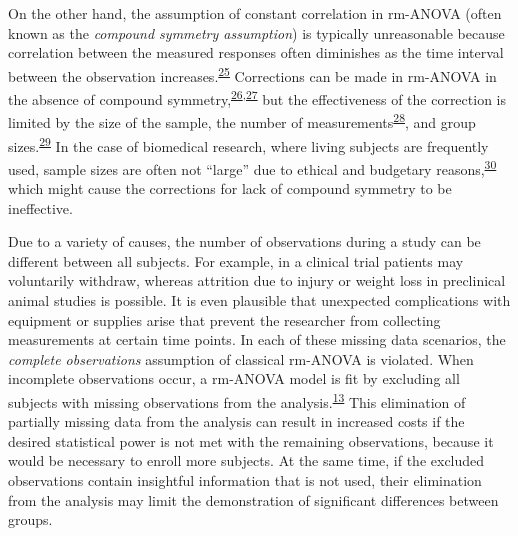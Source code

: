 \documentclass[
]{article}
\begin{document}
On the other hand, the assumption of constant correlation in rm-ANOVA (often known as the \emph{compound symmetry assumption}) is typically unreasonable because correlation between the measured responses often diminishes as the time interval between the observation increases.\textsuperscript{\protect\hyperlink{ref-ugrinowitsch2004}{25}} Corrections can be made in rm-ANOVA in the absence of compound symmetry,\textsuperscript{\protect\hyperlink{ref-huynh1976}{26},\protect\hyperlink{ref-greenhouse1959}{27}} but the effectiveness of the correction is limited by the size of the sample, the number of measurements\textsuperscript{\protect\hyperlink{ref-haverkamp2017}{28}}, and group sizes.\textsuperscript{\protect\hyperlink{ref-keselman2001}{29}} In the case of biomedical research, where living subjects are frequently used, sample sizes are often not ``large'' due to ethical and budgetary reasons,\textsuperscript{\protect\hyperlink{ref-charan2013}{30}} which might cause the corrections for lack of compound symmetry to be ineffective.

Due to a variety of causes, the number of observations during a study can be different between all subjects. For example, in a clinical trial patients may voluntarily withdraw, whereas attrition due to injury or weight loss in preclinical animal studies is possible. It is even plausible that unexpected complications with equipment or supplies arise that prevent the researcher from collecting measurements at certain time points. In each of these missing data scenarios, the \emph{complete observations} assumption of classical rm-ANOVA is violated. When incomplete observations occur, a rm-ANOVA model is fit by excluding all subjects with missing observations from the analysis.\textsuperscript{\protect\hyperlink{ref-gueorguieva2004}{13}} This elimination of partially missing data from the analysis can result in increased costs if the desired statistical power is not met with the remaining observations, because it would be necessary to enroll more subjects. At the same time, if the excluded observations contain insightful information that is not used, their elimination from the analysis may limit the demonstration of significant differences between groups.
\end{document}
